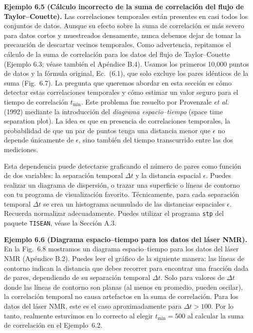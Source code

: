 \documentclass[10pt,a4paper]{book}
\begin{document}
\bigskip

\textbf{Ejemplo 6.5 (Cálculo incorrecto de la suma de correlación del flujo de Taylor–Couette).}  Las correlaciones temporales están presentes en casi todos los conjuntos de datos. Aunque su efecto sobre la suma de correlación es más severo para datos cortos y muestreados densamente, nunca debemos dejar de tomar la precaución de descartar vecinos temporales. Como advertencia, repitamos el cálculo de la suma de correlación para los datos del flujo de Taylor–Couette (Ejemplo 6.3; véase también el Apéndice B.4). Usamos los primeros 10,000 puntos de datos y la fórmula original, Ec.~(6.1), que solo excluye los pares idénticos de la suma (Fig.~6.7). La pregunta que queremos abordar en esta sección es cómo detectar estas correlaciones temporales y cómo estimar un valor seguro para el tiempo de correlación $t_{\min}$. Este problema fue resuelto por Provenzale \textit{et al.} (1992) mediante la introducción del \textit{diagrama espacio–tiempo} (space time separation plot). La idea es que en presencia de correlaciones temporales, la probabilidad de que un par de puntos tenga una distancia menor que $\epsilon$ no depende únicamente de $\epsilon$, sino también del tiempo transcurrido entre las dos mediciones.

\bigskip

Esta dependencia puede detectarse graficando el número de pares como función de dos variables: la separación temporal $\Delta t$ y la distancia espacial $\epsilon$. Puedes realizar un diagrama de dispersión, o trazar una superficie o líneas de contorno con tu programa de visualización favorito. Técnicamente, para cada separación temporal $\Delta t$ se crea un histograma acumulado de las distancias espaciales $\epsilon$. Recuerda normalizar adecuadamente. Puedes utilizar el programa \texttt{stp} del paquete \texttt{TISEAN}, véase la Sección A.3.

\newpage

\textbf{Ejemplo 6.6 (Diagrama espacio–tiempo para los datos del láser NMR).} En la Fig.~6.8 mostramos un diagrama espacio–tiempo para los datos del láser NMR (Apéndice B.2). Puedes leer el gráfico de la siguiente manera: las líneas de contorno indican la distancia que debes recorrer para encontrar una fracción dada de pares, dependiendo de su separación temporal $\Delta t$. Solo para valores de $\Delta t$ donde las líneas de contorno son planas (al menos en promedio, pueden oscilar), la correlación temporal no causa artefactos en la suma de correlación. Para los datos del láser NMR, este es el caso aproximadamente para $\Delta t > 100$. Por lo tanto, realmente estuvimos en lo correcto al elegir $t_{\min} = 500$ al calcular la suma de correlación en el Ejemplo~6.2. 
\end{document}
